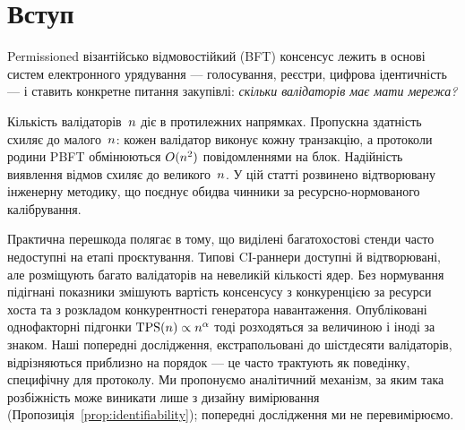 \section{Вступ}
\label{sec:intro}

Permissioned візантійсько відмовостійкий (BFT) консенсус лежить в основі систем
електронного урядування --- голосування, реєстри, цифрова ідентичність --- і
ставить конкретне питання закупівлі: \emph{скільки валідаторів має мати мережа?}

Кількість валідаторів~$n$ діє в протилежних напрямках. Пропускна здатність
схиляє до малого~$n$: кожен валідатор виконує кожну транзакцію, а протоколи
родини PBFT обмінюються $O(n^{2})$ повідомленнями на блок. Надійність
виявлення відмов схиляє до великого~$n$. У цій статті розвинено відтворювану
інженерну методику, що поєднує обидва чинники за ресурсно-нормованого
калібрування.

Практична перешкода полягає в тому, що виділені багатохостові стенди часто
недоступні на етапі проєктування. Типові CI-раннери доступні й відтворювані, але
розміщують багато валідаторів на невеликій кількості ядер. Без нормування
підігнані показники змішують вартість консенсусу з конкуренцією за ресурси хоста
та з розкладом конкурентності генератора навантаження. Опубліковані
однофакторні підгонки $\mathrm{TPS}(n)\propto n^{\alpha}$ тоді розходяться за величиною
і іноді за знаком. Наші попередні дослідження, екстрапольовані до шістдесяти
валідаторів, відрізняються приблизно на порядок --- це часто трактують як
поведінку, специфічну для протоколу. Ми пропонуємо аналітичний механізм, за
яким така розбіжність може виникати лише з дизайну вимірювання
(Пропозиція~\ref{prop:identifiability}); попередні дослідження ми не
перевимірюємо.

